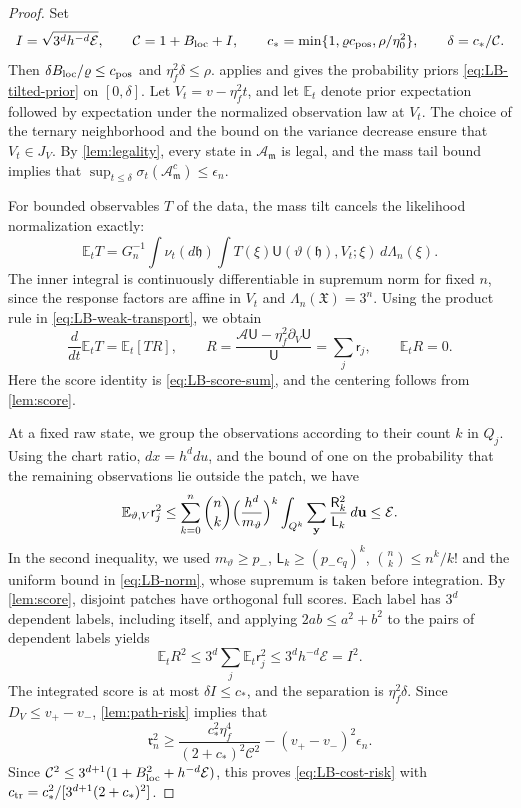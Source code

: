 \begin{proof}
Set
\[
 I=\sqrt{3^dh^{-d}\mathcal E},\qquad
 \mathcal C=1+B_{\rm loc}+I,\qquad
 c_* =\min\{1,\varrho c_{\rm pos},\rho/\eta_0^2\},\qquad
 \delta=c_*/\mathcal C.
\]
Then $\delta B_{\rm loc}/\varrho\le c_{\rm pos}$ and
$\eta_f^2\delta\le\rho$.  applies and
gives the probability priors \eqref{eq:LB-tilted-prior} on $[0,\delta]$.
Let $V_t=v-\eta_f^2t$, and let $\mathbb E_t$ denote prior expectation
followed by expectation under the normalized observation law at
$V_t$. The choice of the ternary neighborhood and the bound on the
variance decrease ensure that $V_t\in J_V$. By \cref{lem:legality}, every state in $\mathcal A_{\mathfrak m}$ is
legal, and the mass tail bound implies that
$\sup_{t\le\delta}\sigma_t(\mathcal A_{\mathfrak m}^c)\le\epsilon_n$.

For bounded observables $T$ of the data, the mass tilt cancels the
likelihood normalization exactly:
\[
 \mathbb E_tT=G_n^{-1}\int\nu_t(d\mathfrak h)
       \int T(\xi)\mathsf U(\vartheta(\mathfrak h),V_t;\xi)
                         \,d\Lambda_n(\xi).
\]
The inner integral is continuously differentiable in supremum norm
for fixed $n$, since the response factors are affine in $V_t$ and
$\Lambda_n(\mathfrak X)=3^n$. Using the product rule in \eqref{eq:LB-weak-transport}, we obtain
\begin{equation}\label{eq:LB-observable-derivative}
 \frac d{dt}\mathbb E_tT=\mathbb E_t[TR],\qquad
 R=\frac{\mathcal A\mathsf U-\eta_f^2\partial_V\mathsf U}{\mathsf U}
   =\sum_j\mathsf r_j,\qquad \mathbb E_tR=0.
\end{equation}
Here the score identity is \eqref{eq:LB-score-sum}, and the centering
follows from \cref{lem:score}.

At a fixed raw state, we group the observations according to their
count $k$ in $Q_j$. Using the chart ratio, $dx=h^ddu$, and the bound of
one on the probability that the remaining observations lie outside the
patch, we have
\[
 \mathbb E_{\vartheta,V}\mathsf r_j^2
 \le\sum_{k=0}^n\binom nk\Bigl(\frac{h^d}{m_\vartheta}\Bigr)^k
 \int_{Q^k}\sum_{\mathbf y}\frac{\mathsf R_k^2}{\mathsf L_k}\,d\mathbf u
 \le\mathcal E.
\]
In the second inequality, we used $m_\vartheta\ge p_-$,
$\mathsf L_k\ge(p_-c_q)^k$, $\binom nk\le n^k/k!$ and the uniform bound
in \eqref{eq:LB-norm}, whose supremum is taken before integration. By
\cref{lem:score}, disjoint patches have orthogonal full scores. Each
label has $3^d$ dependent labels, including itself, and applying
$2ab\le a^2+b^2$ to the pairs of dependent labels yields
\begin{equation}\label{eq:LB-residual-second-moment}
 \mathbb E_tR^2\le3^d\sum_j\mathbb E_t\mathsf r_j^2
                  \le3^dh^{-d}\mathcal E=I^2.
\end{equation}
The integrated score is at most $\delta I\le c_*$, and the separation
is $\eta_f^2\delta$. Since $D_V\le v_+-v_-$, \cref{lem:path-risk}
implies that
\[
 \mathfrak r_n^2\ge
 \frac{c_*^2\eta_f^4}{(2+c_*)^2\mathcal C^2}-(v_+-v_-)^2\epsilon_n.
\]
Since $\mathcal C^2\le3^{d+1}(1+B_{\rm loc}^2+h^{-d}\mathcal E)$,
this proves \eqref{eq:LB-cost-risk} with
$c_{\rm tr}=c_*^2/[3^{d+1}(2+c_*)^2]$.
\end{proof}


